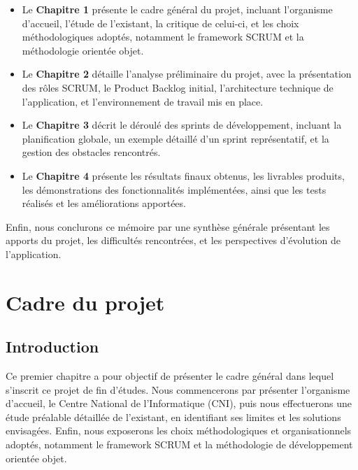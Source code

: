 \documentclass[12pt,a4paper]{report}
\begin{document}
\begin{itemize}[leftmargin=1cm]
    \item Le \textbf{Chapitre 1} présente le cadre général du projet, incluant l'organisme d'accueil, l'étude de l'existant, la critique de celui-ci, et les choix méthodologiques adoptés, notamment le framework SCRUM et la méthodologie orientée objet.
    
    \item Le \textbf{Chapitre 2} détaille l'analyse préliminaire du projet, avec la présentation des rôles SCRUM, le Product Backlog initial, l'architecture technique de l'application, et l'environnement de travail mis en place.
    
    \item Le \textbf{Chapitre 3} décrit le déroulé des sprints de développement, incluant la planification globale, un exemple détaillé d'un sprint représentatif, et la gestion des obstacles rencontrés.
    
    \item Le \textbf{Chapitre 4} présente les résultats finaux obtenus, les livrables produits, les démonstrations des fonctionnalités implémentées, ainsi que les tests réalisés et les améliorations apportées.
\end{itemize}

Enfin, nous conclurons ce mémoire par une synthèse générale présentant les apports du projet, les difficultés rencontrées, et les perspectives d'évolution de l'application.

\mainmatter


\chapter{Cadre du projet}

\section*{Introduction}

Ce premier chapitre a pour objectif de présenter le cadre général dans lequel s'inscrit ce projet de fin d'études. Nous commencerons par présenter l'organisme d'accueil, le Centre National de l'Informatique (CNI), puis nous effectuerons une étude préalable détaillée de l'existant, en identifiant ses limites et les solutions envisagées. Enfin, nous exposerons les choix méthodologiques et organisationnels adoptés, notamment le framework SCRUM et la méthodologie de développement orientée objet.
\end{document}
